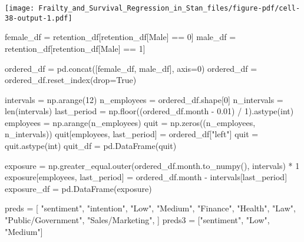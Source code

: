 \documentclass[
  letterpaper,
  DIV=11,
  numbers=noendperiod]{scrartcl}
\newenvironment{Shaded}{\begin{snugshade}}{\end{snugshade}}
\newcommand{\BuiltInTok}[1]{\textcolor[rgb]{0.00,0.23,0.31}{#1}}
\newcommand{\DecValTok}[1]{\textcolor[rgb]{0.68,0.00,0.00}{#1}}
\newcommand{\FloatTok}[1]{\textcolor[rgb]{0.68,0.00,0.00}{#1}}
\newcommand{\NormalTok}[1]{\textcolor[rgb]{0.00,0.23,0.31}{#1}}
\newcommand{\OperatorTok}[1]{\textcolor[rgb]{0.37,0.37,0.37}{#1}}
\newcommand{\StringTok}[1]{\textcolor[rgb]{0.13,0.47,0.30}{#1}}
\newcommand{\VariableTok}[1]{\textcolor[rgb]{0.07,0.07,0.07}{#1}}
\begin{document}
\texttt{[image: Frailty\_and\_Survival\_Regression\_in\_Stan\_files/figure-pdf/cell-38-output-1.pdf]}

\begin{Shaded}
\begin{Highlighting}[]
\NormalTok{female\_df }\OperatorTok{=}\NormalTok{ retention\_df[retention\_df[}\StringTok{\textquotesingle{}Male\textquotesingle{}}\NormalTok{] }\OperatorTok{==} \DecValTok{0}\NormalTok{]}
\NormalTok{male\_df }\OperatorTok{=}\NormalTok{ retention\_df[retention\_df[}\StringTok{\textquotesingle{}Male\textquotesingle{}}\NormalTok{] }\OperatorTok{==} \DecValTok{1}\NormalTok{]}

\NormalTok{ordered\_df }\OperatorTok{=}\NormalTok{ pd.concat([female\_df, male\_df], axis}\OperatorTok{=}\DecValTok{0}\NormalTok{)}
\NormalTok{ordered\_df }\OperatorTok{=}\NormalTok{ ordered\_df.reset\_index(drop}\OperatorTok{=}\VariableTok{True}\NormalTok{)}

\NormalTok{intervals }\OperatorTok{=}\NormalTok{ np.arange(}\DecValTok{12}\NormalTok{)}
\NormalTok{n\_employees }\OperatorTok{=}\NormalTok{ ordered\_df.shape[}\DecValTok{0}\NormalTok{]}
\NormalTok{n\_intervals }\OperatorTok{=} \BuiltInTok{len}\NormalTok{(intervals)}
\NormalTok{last\_period }\OperatorTok{=}\NormalTok{ np.floor((ordered\_df.month }\OperatorTok{{-}} \FloatTok{0.01}\NormalTok{) }\OperatorTok{/} \DecValTok{1}\NormalTok{).astype(}\BuiltInTok{int}\NormalTok{)}
\NormalTok{employees }\OperatorTok{=}\NormalTok{ np.arange(n\_employees)}
\NormalTok{quit }\OperatorTok{=}\NormalTok{ np.zeros((n\_employees, n\_intervals))}
\NormalTok{quit[employees, last\_period] }\OperatorTok{=}\NormalTok{ ordered\_df[}\StringTok{"left"}\NormalTok{]}
\NormalTok{quit }\OperatorTok{=}\NormalTok{ quit.astype(}\BuiltInTok{int}\NormalTok{)}
\NormalTok{quit\_df }\OperatorTok{=}\NormalTok{ pd.DataFrame(quit)}

\NormalTok{exposure }\OperatorTok{=}\NormalTok{ np.greater\_equal.outer(ordered\_df.month.to\_numpy(), intervals) }\OperatorTok{*} \DecValTok{1}
\NormalTok{exposure[employees, last\_period] }\OperatorTok{=}\NormalTok{ ordered\_df.month }\OperatorTok{{-}}\NormalTok{ intervals[last\_period]}
\NormalTok{exposure\_df }\OperatorTok{=}\NormalTok{ pd.DataFrame(exposure)}


\NormalTok{preds }\OperatorTok{=}\NormalTok{ [}
    \StringTok{"sentiment"}\NormalTok{,}
    \StringTok{"intention"}\NormalTok{,}
    \StringTok{"Low"}\NormalTok{,}
    \StringTok{"Medium"}\NormalTok{,}
    \StringTok{"Finance"}\NormalTok{,}
    \StringTok{"Health"}\NormalTok{,}
    \StringTok{"Law"}\NormalTok{,}
    \StringTok{"Public/Government"}\NormalTok{,}
    \StringTok{"Sales/Marketing"}\NormalTok{,}
\NormalTok{]}
\NormalTok{preds3 }\OperatorTok{=}\NormalTok{ [}\StringTok{"sentiment"}\NormalTok{, }\StringTok{"Low"}\NormalTok{, }\StringTok{"Medium"}\NormalTok{]}


\end{Highlighting}
\end{Shaded}
\end{document}
